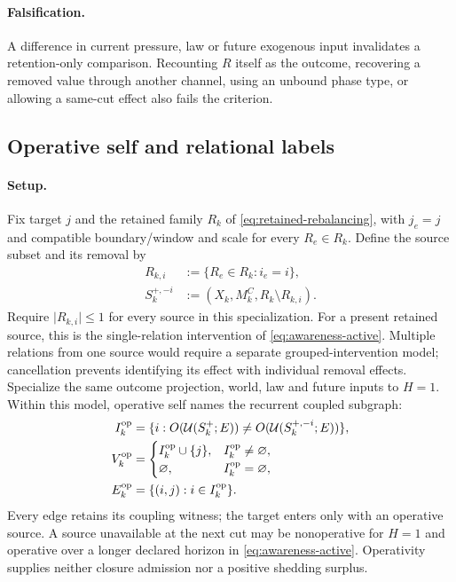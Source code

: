 \paragraph{Falsification.}
A difference in current pressure, law or future exogenous input invalidates
a retention-only comparison. Recounting \(R\) itself as the outcome,
recovering a removed value through another channel, using an unbound
phase type, or allowing a same-cut effect also fails the criterion.


\subsection{Operative self and relational labels}
\label{subsec:operative-self}
\paragraph{Setup.}
Fix target \(j\) and the retained family \(R_k\) of
\eqref{eq:retained-rebalancing}, with \(j_e=j\) and compatible boundary/window
and scale for every \(R_e\in R_k\). Define the source subset and its removal by
\begin{equation}
 \begin{aligned}
 R_{k,i}&:=\{R_e\in R_k:i_e=i\},\\
 S_k^{+,-i}&:=(X_k,M^C_k,R_k\setminus R_{k,i}).
 \end{aligned}
 \label{eq:operative-source-removal}
\end{equation}
Require \(\lvert R_{k,i}\rvert\le1\) for every source in this specialization.
For a present retained source, this is the single-relation intervention of
\eqref{eq:awareness-active}. Multiple relations from one source would require
a separate grouped-intervention model; cancellation prevents identifying its
effect with individual removal effects.
Specialize the same outcome projection, world, law and future inputs to
\(H=1\). Within this model, operative self names the recurrent coupled subgraph:
\begin{equation}
 \begin{aligned}
 I^{\rm op}_k&=\{i:O(\mathcal U(S_k^+;E))\ne
 O(\mathcal U(S_k^{+,-i};E))\},\\
 V^{\rm op}_k&=\begin{cases}I^{\rm op}_k\cup\{j\},&I^{\rm op}_k\ne\varnothing,\\
 \varnothing,&I^{\rm op}_k=\varnothing,\end{cases}\\
 E^{\rm op}_k&=\{(i,j):i\in I^{\rm op}_k\}.
 \end{aligned}
 \label{eq:operative-self}
\end{equation}
Every edge retains its coupling witness; the target enters only with an
operative source. A source unavailable at the next cut may be nonoperative
for \(H=1\) and operative over a longer declared horizon in
\eqref{eq:awareness-active}. Operativity supplies neither closure admission
nor a positive shedding surplus.

